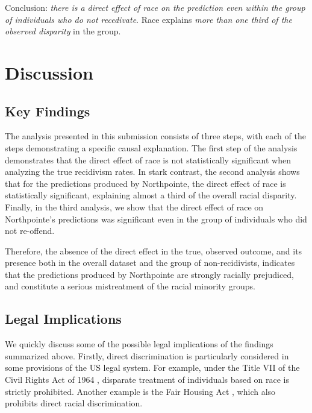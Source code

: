 \documentclass{article}
\begin{document}
Conclusion: \emph{there is a direct effect of race on the prediction
even within the group of individuals who do not recedivate}. Race
explains \emph{more than one third of the observed disparity} in the
group.

\hypertarget{discussion}{%
\section{Discussion}\label{discussion}}

\hypertarget{key-findings}{%
\subsection{Key Findings}\label{key-findings}}

The analysis presented in this submission consists of three steps, with
each of the steps demonstrating a specific causal explanation. The first
step of the analysis demonstrates that the direct effect of race is not
statistically significant when analyzing the true recidivism rates. In
stark contrast, the second analysis shows that for the predictions
produced by Northpointe, the direct effect of race is statistically
significant, explaining almost a third of the overall racial disparity.
Finally, in the third analysis, we show that the direct effect of race
on Northpointe's predictions was significant even in the group of
individuals who did not re-offend.

Therefore, the absence of the direct effect in the true, observed
outcome, and its presence both in the overall dataset and the group of
non-recidivists, indicates that the predictions produced by Northpointe
are strongly racially prejudiced, and constitute a serious mistreatment
of the racial minority groups.

\hypertarget{legal-implications}{%
\subsection{Legal Implications}\label{legal-implications}}

We quickly discuss some of the possible legal implications of the
findings summarized above. Firstly, direct discrimination is
particularly considered in some provisions of the US legal system. For
example, under the Title VII of the Civil Rights Act of 1964
\cite{act1964civil}, disparate treatment of individuals based on race is
strictly prohibited. Another example is the Fair Housing Act
\cite{housing1968fair}, which also prohibits direct racial
discrimination.
\end{document}
